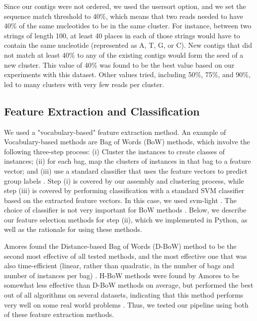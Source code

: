 Since our contigs were not ordered, we used the usersort option, and we set the sequence match threshold to 40\%, which means that two reads needed to have 40\% of the same nucleotides to be in the same cluster. For instance, between two strings of length 100, at least 40 places in each of those strings would have to contain the same nucleotide (represented as A, T, G, or C). New contigs that did not match at least 40\% to any of the existing contigs would form the seed of a new cluster. This value of 40\% was found to be the best value based on our experiments with this dataset. Other values tried, including 50\%, 75\%, and 90\%, led to many clusters with very few reads per cluster.

\subsection{Feature Extraction and Classification}
\label{feature-extraction}

We used a "vocabulary-based" feature extraction method. An example of Vocabulary-based methods are Bag of Words (BoW) methods, which involve the following three-step process: (i) Cluster the instances to create classes of instances; (ii) for each bag, map the clusters of instances in that bag to a feature vector; and (iii) use a standard classifier that uses the feature vectors to predict group labels \cite{amores13}. Step (i) is covered by our assembly and clustering process, while step (iii) is covered by performing classification with a standard SVM classifier based on the extracted feature vectors. In this case, we used svm-light \cite{joachims08}. The choice of classifier is not very important for BoW methods \cite{amores13}. Below, we describe our feature selection methods for step (ii), which we implemented in Python, as well as the rationale for using these methods. 

Amores found the Distance-based Bag of Words (D-BoW) method to be the second most effective of all tested methods, and the most effective one that was also time-efficient (linear, rather than quadratic, in the number of bags and number of instances per bag) \cite{amores13}. H-BoW methods were found by Amores to be somewhat less effective than D-BoW methods on average, but performed the best out of all algorithms on several datasets, indicating that this method performs very well on some real world problems \cite{amores13}. Thus, we tested our pipeline using both of these feature extraction methods. 

